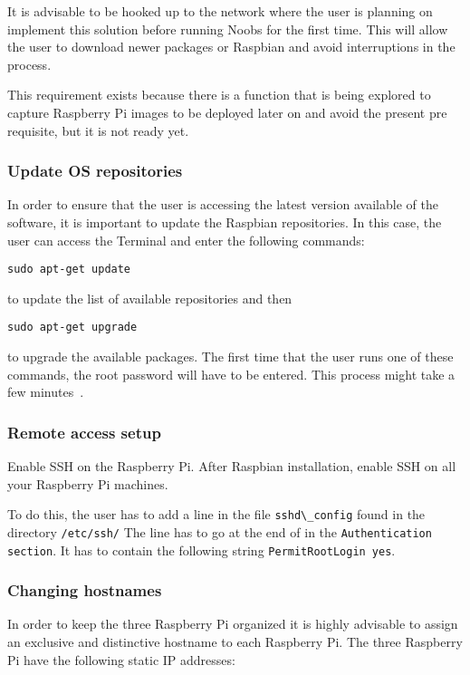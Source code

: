 It is advisable to be hooked up to the network where the user is
planning on implement this solution before running Noobs for the first
time. This will allow the user to download newer packages or Raspbian
and avoid interruptions in the process.
		
This requirement exists because there is a function that is being
explored to capture Raspberry Pi images to be deployed later on and
avoid the present pre requisite, but it is not ready yet.
	
\subsubsection{Update OS repositories}

In order to ensure that the user is accessing the latest version
available of the software, it is important to update the Raspbian
repositories.  In this case, the user can access the Terminal and
enter the following commands:
	
\verb|sudo apt-get update| 

to update the list of
available repositories and then 

\verb|sudo apt-get upgrade| 

to upgrade the available packages. The first time that the user runs
one of these commands, the root password will have to be entered.
This process might take a few minutes~\cite{debianpackage}.
	
\subsubsection{Remote access setup}

Enable SSH on the Raspberry Pi.  After Raspbian installation, enable
SSH on all your Raspberry Pi machines.
	
To do this, the user has to add a line in the file
\verb|sshd\_config| found in the directory
\verb|/etc/ssh/| The line has to go at the end of in
the \verb|Authentication section|.  It has to contain
the following string \verb|PermitRootLogin yes|.
\cite{rootSsh}
	
\subsubsection{Changing hostnames}

In order to keep the three Raspberry Pi organized it is highly
advisable to assign an exclusive and distinctive hostname to each
Raspberry Pi.  The three Raspberry Pi have the following static IP
addresses:

